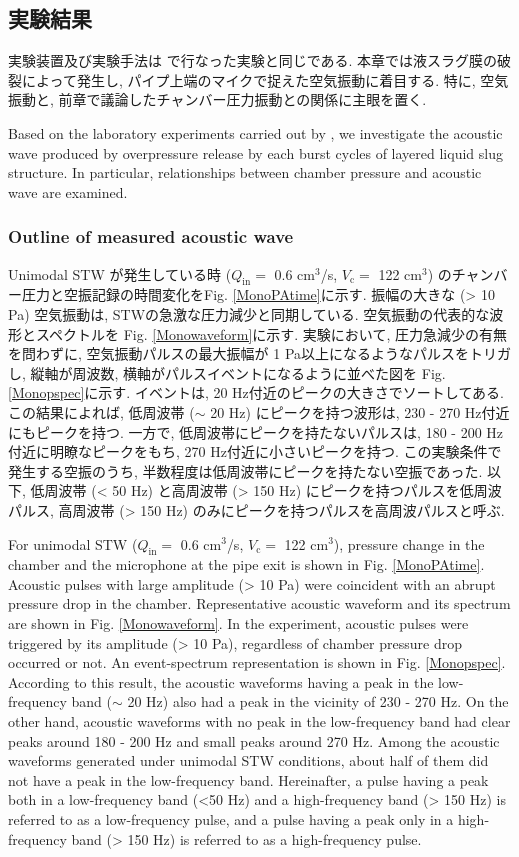 \documentclass[12pt]{article}
\begin{document}
\clearpage \newpage
\subsection{実験結果}\label{ACOresult}
実験装置及び実験手法は \cite{kanno2018} で行なった実験と同じである. 本章では液スラグ膜の破裂によって発生し, パイプ上端のマイクで捉えた空気振動に着目する. 
特に, 空気振動と, 前章で議論したチャンバー圧力振動との関係に主眼を置く.  

Based on the laboratory experiments carried out by \cite{kanno2018}, we investigate the acoustic wave produced by overpressure release by each burst cycles of layered liquid slug structure. 
In particular, relationships between chamber pressure and acoustic wave are examined.


\subsubsection{Outline of measured acoustic wave}
Unimodal STW が発生している時 ($Q_\mathrm{in}=$ 0.6 cm$^3$/s, $V_\mathrm{c}=$ 122 cm$^3$) のチャンバー圧力と空振記録の時間変化をFig. \ref{MonoPAtime}に示す. 
振幅の大きな (> 10 Pa) 空気振動は, STWの急激な圧力減少と同期している.
空気振動の代表的な波形とスペクトルを Fig. \ref{Monowaveform}に示す. 
実験において, 圧力急減少の有無を問わずに, 空気振動パルスの最大振幅が 1 Pa以上になるようなパルスをトリガし, 縦軸が周波数, 横軸がパルスイベントになるように並べた図を Fig. \ref{Monopspec}に示す. 
イベントは, 20 Hz付近のピークの大きさでソートしてある. 
この結果によれば, 低周波帯 ($\sim$ 20 Hz) にピークを持つ波形は, 230 - 270 Hz付近にもピークを持つ. 
一方で, 低周波帯にピークを持たないパルスは, 180 - 200 Hz付近に明瞭なピークをもち, 270 Hz付近に小さいピークを持つ. 
この実験条件で発生する空振のうち, 半数程度は低周波帯にピークを持たない空振であった. 
以下, 低周波帯 (< 50 Hz) と高周波帯 (> 150 Hz) にピークを持つパルスを低周波パルス, 高周波帯 (> 150 Hz) のみにピークを持つパルスを高周波パルスと呼ぶ. 

For unimodal STW ($Q_\mathrm{in}=$ 0.6 cm$^3$/s, $V_\mathrm{c}=$ 122 cm$^3$), pressure change in the chamber and the microphone at the pipe exit is shown in Fig. \ref{MonoPAtime}.
Acoustic pulses with large amplitude (> 10 Pa) were coincident with an abrupt pressure drop in the chamber.
Representative acoustic waveform and its spectrum are shown in Fig. \ref{Monowaveform}.
In the experiment, acoustic pulses were triggered by its amplitude (> 10 Pa), regardless of chamber pressure drop occurred or not. 
An event-spectrum representation is shown in Fig. \ref{Monopspec}. 
According to this result, the acoustic waveforms having a peak in the low-frequency band ($\sim$ 20 Hz) also had a peak in the vicinity of 230 - 270 Hz.
On the other hand, acoustic waveforms with no peak in the low-frequency band had clear peaks around 180 - 200 Hz and small peaks around 270 Hz.
Among the acoustic waveforms generated under unimodal STW conditions, about half of them did not have a peak in the low-frequency band.
Hereinafter, a pulse having a peak both in a low-frequency band (<50 Hz) and a high-frequency band (> 150 Hz) is referred to as a low-frequency pulse, and a pulse having a peak only in a high-frequency band (> 150 Hz) is referred to as a high-frequency pulse.
\end{document}
